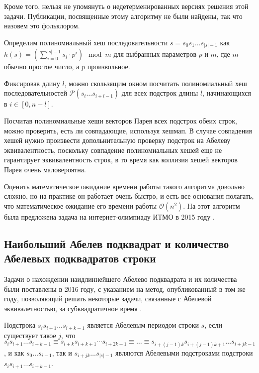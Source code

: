 Кроме того, нельзя не упомянуть о недетерменированных версиях решения этой задачи. Публикации, посвященные этому алгоритму не были найдены, так что назовем это фольклором.

Определим полиномиальный хеш последовательности $s=s_0s_1\ldots s_{|s|-1}$ как $h(s)=(\sum\limits_{i=0}^{|s|-1} s_i \cdot p^i) \mod{m}$ для выбранных параметров $p$ и $m$, где $m$ обычно простое число, а $p$ произвольное.

Фиксировав длину $l$, можно скользящим окном посчитать полиномиальный хеш последовательностей $\mathcal{P}(s_i\ldots s_{i+l-1})$ для всех подстрок длины $l$, начинающихся в $i \in [0, n-l]$. 

Посчитав полиномиальные хеши векторов Парея всех подстрок обеих строк, можно проверить, есть ли совпадающие, используя хешмап. В случае совпадения хешей нужно произвести допольнительную проверку подстрок на Абелеву эквивалентность, поскольку совпадение полиномиальных хешей еще не гарантирует эквивалентность строк, в то время как коллизия хешей векторов Парея очень маловероятна.

Оценить математическое ожидание времени работы такого алгоритма довольно сложно, но на практике он работает очень быстро, и есть все основания полагать, что математическое ожидание его времени работы $\mathcal{O}(n^2)$. На этот алгоритм была предложена задача на интернет-олимпиаду ИТМО в 2015 году \cite{6}.

\subsection{Наибольший Абелев подквадрат и количество Абелевых подквадратов строки}
Задачи о нахождении наидлиннейшего Абелево подквадрата и их количества были поставлены в 2016 году, с указанием на метод, опубликованный в том же году, позволяющий решать некоторые задачи, связанные с Абелевой эквивалетностью, за субквадратичное время \cite{5}.

\begin{definition}
Подстрока $s_i s_{i+1} \ldots s_{i+k-1}$ является Абелевым периодом строки $s$, если существует такое $j$, что $s_i s_{i+1} \ldots s_{i+k-1} \equiv s_{i+k} s_{i+k+1} \cdots s_{i+2k-1} \equiv \ldots \equiv s_{i+(j-1)k} s_{i+(j-1)k+1} \ldots s_{i+jk-1}$, и как $s_0 \ldots s_{i-1}$, так и $s_{i+jk} \ldots s_{|s|-1}$ являются Абелевыми подстроками подстроки $s_i s_{i+1} \ldots s_{i+k-1}$.
\end{definition}

